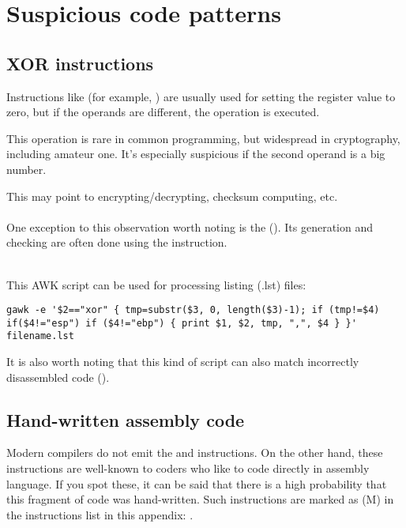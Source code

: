 \section{Suspicious code patterns}

\subsection{XOR instructions}

Instructions like  (for example, ) 
are usually used for setting the register value
to zero, but if the operands are different, the  operation
is executed.

This operation is rare in common programming, but widespread in cryptography,
including amateur one.
It's especially suspicious if the
second operand is a big number.

This may point to encrypting/decrypting, checksum computing, etc.\\
\\

One exception to this observation worth noting is the  (). 
Its generation and checking are often done using the \XOR instruction. \\
\\

This AWK script can be used for processing \IDA{} listing (.lst) files:

\begin{lstlisting}
gawk -e '$2=="xor" { tmp=substr($3, 0, length($3)-1); if (tmp!=$4) if($4!="esp") if ($4!="ebp") { print $1, $2, tmp, ",", $4 } }' filename.lst
\end{lstlisting}

It is also worth noting that this kind of script can also match incorrectly disassembled code 
().

\subsection{Hand-written assembly code}


Modern compilers do not emit the  and  instructions.
On the other hand, these instructions are well-known to coders who like to code directly in assembly language.
If you spot these, it can be said that there is a high probability that this fragment of code was hand-written.
Such instructions are marked as (M) in the instructions list in this appendix: .

